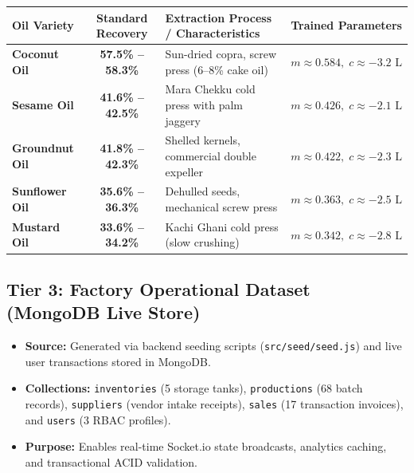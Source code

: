 \documentclass[11pt,a4paper]{article}
\begin{document}
\vspace{0.2cm}
\begin{center}
\begin{tabularx}{\textwidth}{l c X c}
\toprule
\textbf{Oil Variety} & \textbf{Standard Recovery} & \textbf{Extraction Process / Characteristics} & \textbf{Trained Parameters} \\
\midrule
\textbf{Coconut Oil}   & \textbf{57.5\% -- 58.3\%} & Sun-dried copra, screw press (6--8\% cake oil) & $m \approx 0.584,\; c \approx -3.2\text{ L}$ \\
\textbf{Sesame Oil}    & \textbf{41.6\% -- 42.5\%} & Mara Chekku cold press with palm jaggery        & $m \approx 0.426,\; c \approx -2.1\text{ L}$ \\
\textbf{Groundnut Oil} & \textbf{41.8\% -- 42.3\%} & Shelled kernels, commercial double expeller    & $m \approx 0.422,\; c \approx -2.3\text{ L}$ \\
\textbf{Sunflower Oil} & \textbf{35.6\% -- 36.3\%} & Dehulled seeds, mechanical screw press         & $m \approx 0.363,\; c \approx -2.5\text{ L}$ \\
\textbf{Mustard Oil}   & \textbf{33.6\% -- 34.2\%} & Kachi Ghani cold press (slow crushing)          & $m \approx 0.342,\; c \approx -2.8\text{ L}$ \\
\bottomrule
\end{tabularx}
\end{center}
\vspace{0.2cm}

\subsection{Tier 3: Factory Operational Dataset (MongoDB Live Store)}
\begin{itemize}[leftmargin=1.5em]
    \item \textbf{Source:} Generated via backend seeding scripts (\texttt{src/seed/seed.js}) and live user transactions stored in MongoDB.
    \item \textbf{Collections:} \texttt{inventories} (5 storage tanks), \texttt{productions} (68 batch records), \texttt{suppliers} (vendor intake receipts), \texttt{sales} (17 transaction invoices), and \texttt{users} (3 RBAC profiles).
    \item \textbf{Purpose:} Enables real-time Socket.io state broadcasts, analytics caching, and transactional ACID validation.
\end{itemize}
\end{document}
